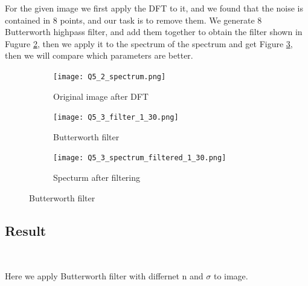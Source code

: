 \documentclass[
	12pt, %
]{style/fphw}
\begin{document}
For the given image we first apply the DFT to it, and we found that the noise is contained in 8 points, and our task is to remove them. We generate 8 Butterworth highpass filter, and add them together to obtain the filter shown in Fugure \ref{Q5_2_filter}, then we apply it to the spectrum of the spectrum and get Figure \ref{Q5_3_spectrum_filtered_1_30}, then we will compare which parameters are better.

\begin{figure}[H]
    \centering
    \begin{subfigure}[b]{.3\textwidth}
         \centering
         \texttt{[image: Q5\_2\_spectrum.png]}
         \caption{Original image after DFT}
         \label{Q5_2_spectrum}
     \end{subfigure}
     \hfill
     \begin{subfigure}[b]{.3\textwidth}
         \centering
         \texttt{[image: Q5\_3\_filter\_1\_30.png]}
         \caption{Butterworth filter}
         \label{Q5_2_filter}
     \end{subfigure}
     \hfill
     \begin{subfigure}[b]{.3\textwidth}
         \centering
         \texttt{[image: Q5\_3\_spectrum\_filtered\_1\_30.png]}
         \caption{Specturm after filtering}
         \label{Q5_3_spectrum_filtered_1_30}
     \end{subfigure}
    \caption{Butterworth filter}
    \label{Butterworth filter}
\end{figure}

\subsection*{Result} \

Here we apply Butterworth filter with differnet n and $\sigma$ to image.
\end{document}
